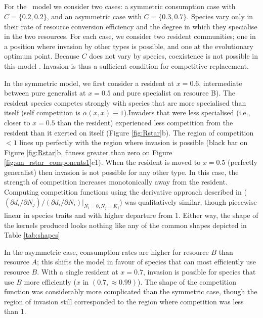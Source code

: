 \documentclass[a4paper,11pt]{article}
\begin{document}
%

\subsection{\Rstar}

For the \Rstar\ model we consider two cases: a symmetric
consumption case with $C = \{0.2, 0.2\}$, and an asymmetric case
with $C = \{0.3, 0.7\}$.  Species vary only in their rate of resource
conversion efficiency and the degree in which they specialise in the
two resources.  For each case, we consider two resident communities;
one in a position where invasion by other types is possible, and one at
the evolutionary optimum point.
%
Because $C$ does not vary by species, coexistence is not possible in
this model \citep{Tilman-1982}. Invasion is thus a sufficient condition for
competitive replacement.

In the symmetric model, we first consider a resident at $x = 0.6$,
intermediate between pure generalist at $x=0.5$ and pure specialist on resource B).
%
The resident species competes strongly with species that are more
specialised than itself (self competition is $\alpha(x, x) \equiv
1$).Invaders that were less specialised (i.e., closer to $x =
0.5$ than the resident) experienced less competition from the resident
than it exerted on itself (Figure \ref{fig:Rstar}b).
%
The region of competition $< 1$ lines up perfectly with the region
where invasion is possible (black bar on Figure \ref{fig:Rstar}b,
fitness greater than zero on Figure
\ref{fig:sm_rstar_components1}c1).
%
When the resident is moved to $x = 0.5$ (perfectly generalist) then
invasion is not possible for any other type.  In this case, the strength of
competition increases monotonically away from the resident.
%
Computing competition functions using the derivative approach
described in \citet{Abrams-2008}
($(\partial d_i / \partial N_j) / (\partial d_i / \partial N_i) |_{N_i
  = 0, N_j = K_j}$)
was qualitatively similar, though piecewise linear in species traits
and with higher departure from 1.
Either way, the shape of the kernels produced looks nothing like any of the
common shapes depicted in Table \ref{tab:shapes}

In the asymmetric case, consumption rates are higher for
resource $B$ than resource $A$; this shifts the model in favour of
species that can most efficiently use resource $B$.
%
With a single resident at $x = 0.7$, invasion is possible for species
that use $B$ more efficiently ($x$ in $(0.7, \approx 0.99)$).
%
The shape of the competition function was considerably more
complicated than the symmetric case, though the region of invasion
still corresponded to the region where competition was less than 1.
\end{document}
